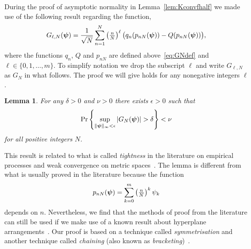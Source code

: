 \documentclass[aap]{imsart}
\newcommand{\prob}{\operatorname{Pr}}
\newcommand{\abs}[1]{\left\vert #1 \right\vert}
\newtheorem{lemma}{Lemma}
\begin{document}
During the proof of asymptotic normality in Lemma~\ref{lem:Kconvfhalf} we made use of the following result regarding the function,
\[
G_{\ell,N}(\boldsymbol{\psi}) = \frac{1}{\sqrt{N}} \sum_{n=1}^{N}\left( \tfrac{n}{N}\right)^\ell  \big(q_n(p_{nN}(\boldsymbol{\psi})) - Q(p_{nN}(\boldsymbol{\psi})) \big),
\]
where the functions $q_n$, $Q$ and $p_{nN}$ are defined above~\eqref{eq:GNdef} and $\ell \in \{0, 1, \dots, m\}$.  To simplify notation we drop the subscript $\ell$ and write $G_{\ell,N}$ as $G_N$ in what follows.  The proof we will give holds for any nonegative integers $\ell$.

\begin{lemma}\label{lem:unifprobG}
For any $\delta >0$ and $\nu > 0$ there exists $\epsilon > 0$ such that
\[
\prob\left\{ \sup_{\|\psibf\|_{\infty} < \epsilon} \abs{ G_N(\psibf) } > \delta   \right\} < \nu %
\]
for all positive integers $N$.
\end{lemma}

This result is related to what is called \emph{tightness} in the literature on empirical processes and weak convergence on metric spaces~\cite{Billingsley1999_convergence_of_probability_measures,Dudley_unif_central_lim_th_1999,Shorak_emp_proc_stat_2009}.  The lemma is different from what is usually proved in the literature because the function 
\[
p_{nN}(\boldsymbol{\psi}) = \sum_{k=0}^m\left( \tfrac{n}{N}\right)^k\psi_k
\]
depends on $n$.  Nevertheless, we find that the methods of proof from the literature can still be used if we make use of a known result about hyperplane arrangements~\cite[Ch. 5]{Chazelle_discrepency_method_2000}\cite[Ch. 6]{Matousek_lect_disc_geom_2002}. Our proof is based on a technique called \emph{symmetrisation} and another technique called \emph{chaining} (also known as \emph{bracketing})~\cite{Pollard_asymp_empi_proc_1989}.
\end{document}
